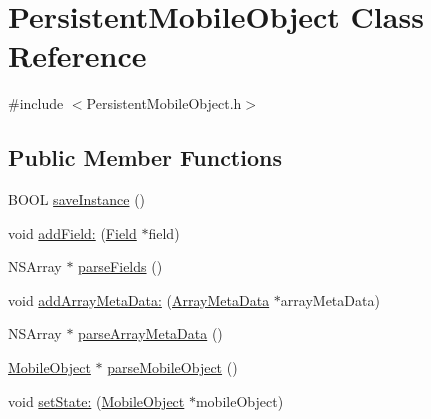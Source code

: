 \hypertarget{interface_persistent_mobile_object}{
\section{\-Persistent\-Mobile\-Object \-Class \-Reference}
\label{interface_persistent_mobile_object}
}


{\ttfamily \#include $<$\-Persistent\-Mobile\-Object.\-h$>$}

\subsection*{\-Public \-Member \-Functions}
\begin{DoxyCompactItemize}
\item 
\-B\-O\-O\-L \hyperlink{interface_persistent_mobile_object_a725c72be55d2f166c4e297c1932e83fe}{save\-Instance} ()
\item 
void \hyperlink{interface_persistent_mobile_object_a8364caa2eec8a3f23b4d0342ec669838}{add\-Field\-:} (\hyperlink{interface_field}{\-Field} $\ast$field)
\item 
\-N\-S\-Array $\ast$ \hyperlink{interface_persistent_mobile_object_aea1bb63fa2ce9ef1b13d19a254cfa9a7}{parse\-Fields} ()
\item 
void \hyperlink{interface_persistent_mobile_object_af43783dcae0a163e816737123c1c454d}{add\-Array\-Meta\-Data\-:} (\hyperlink{interface_array_meta_data}{\-Array\-Meta\-Data} $\ast$array\-Meta\-Data)
\item 
\-N\-S\-Array $\ast$ \hyperlink{interface_persistent_mobile_object_ad2b2551f4e477956e02fbaf8d9412946}{parse\-Array\-Meta\-Data} ()
\item 
\hyperlink{interface_mobile_object}{\-Mobile\-Object} $\ast$ \hyperlink{interface_persistent_mobile_object_a8116e82d5200e2d452d6a3cf7e06f2e2}{parse\-Mobile\-Object} ()
\item 
void \hyperlink{interface_persistent_mobile_object_a7ef49dc59ef03e4a259914cbc63844b2}{set\-State\-:} (\hyperlink{interface_mobile_object}{\-Mobile\-Object} $\ast$mobile\-Object)
\end{DoxyCompactItemize}
